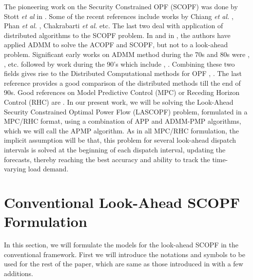 \documentclass[preprint,12pt,3p]{elsarticle}
\begin{document}
The pioneering work on the Security Constrained OPF (SCOPF) was done by Stott \emph{et al} in \cite{1458198}. Some of the recent references include works by Chiang \emph{et al.} \cite{CG:11}, Phan \emph{et al.} \cite{PK:12}, Chakrabarti \emph{et al.} \cite{CK:14} etc. The last two deal with application of distributed algorithms to the SCOPF problem. In \cite{E:14} and in \cite{LKWZ:13}, the authors have applied ADMM to solve the ACOPF and SCOPF, but not to a look-ahead problem. Significant early works on ADMM method during the 70s and 80s were \cite{GlM:75}, \cite{Gab:83}, \cite{FG:83} etc. followed by work during the 90's which include \cite{EF:93}, \cite{Eck:94b}. Combining these two fields gives rise to the Distributed Computational methods for OPF \cite{KB:97}, \cite{KB:00}. The last reference provides a good comparison of the distributed methods till the end of 90s. Good references on Model Predictive Control (MPC) or Receding Horizon Control (RHC) are \cite{QB:03,CTHK:03,Her:05,TR:04,KW:11}. In our present work, we will be solving the Look-Ahead Security Constrained Optimal Power Flow (LASCOPF) problem, formulated in a MPC/RHC format, using a combination of APP and ADMM-PMP algorithms, which we will call the APMP algorithm. As in all MPC/RHC formulation, the implicit assumption will be that, this problem for several look-ahead dispatch intervals is solved at the beginning of each dispatch interval, updating the forecasts, thereby reaching the best accuracy and ability to track the time-varying load demand.

\section{Conventional Look-Ahead SCOPF Formulation}
\label{conventional}
In this section, we will formulate the models for the look-ahead SCOPF in the conventional framework. First we will introduce the notations and symbols to be used for the rest of the paper, which are same as those introduced in \cite{CK:14} with a few additions.
\end{document}
